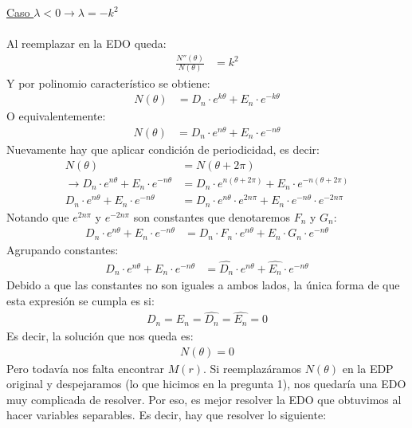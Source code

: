 \documentclass[
  11pt,
  letterpaper,
   answers
  ]{exam}
\begin{document}
\begin{questions}
\begin{solution}
\begin{parts}
    \underline{Caso $\lambda < 0 \rightarrow \lambda = - k^2$}
    \\
    \\
    Al reemplazar en la EDO queda:
    \begin{align}
        \frac{N''(\theta)}{N(\theta)} &= k^2
    \end{align}
    Y por polinomio característico se obtiene:
    \begin{align}
        N(\theta) &= D_n \cdot e^{k \theta} + E_n \cdot e^{-k \theta}
    \end{align}
    O equivalentemente:
    \begin{align}
      N(\theta) &= D_n \cdot e^{n \theta} + E_n \cdot e^{-n \theta}  
    \end{align}
    Nuevamente hay que aplicar condición de periodicidad, es decir:
    \begin{align}
        N(\theta) &= N(\theta + 2 \pi) \\
        \rightarrow D_n \cdot e^{n \theta} + E_n \cdot e^{-n \theta} &= D_n \cdot e^{n( \theta + 2 \pi)} + E_n \cdot e^{-n (\theta + 2 \pi)} \\
        D_n \cdot e^{n \theta} + E_n \cdot e^{-n \theta} &= D_n \cdot e^{n \theta} \cdot e^{2 n \pi} + E_n \cdot e^{-n \theta} \cdot e^{-2 n \pi}
    \end{align}
    Notando que $e^{2 n \pi}$ y $e^{-2 n \pi}$ son constantes que denotaremos $F_n$ y $G_n$:
    \begin{align}
        D_n \cdot e^{n \theta} + E_n \cdot e^{-n \theta} &= D_n \cdot F_n \cdot e^{n \theta} + E_n \cdot G_n \cdot e^{-n \theta}
    \end{align}
    Agrupando constantes:
    \begin{align}
        D_n \cdot e^{n \theta} + E_n \cdot e^{-n \theta} &= \hat{D_n} \cdot e^{n \theta} + \hat{E_n} \cdot e^{-n \theta}
    \end{align}
    Debido a que las constantes no son iguales a ambos lados, la única forma de que esta expresión se cumpla es si:
    \begin{align}
        D_n = E_n = \hat{D_n} = \hat{E_n} = 0
    \end{align}
    Es decir, la solución que nos queda es:
    \begin{align}
        N(\theta) = 0
    \end{align}
Pero todavía nos falta encontrar $M(r)$. Si reemplazáramos $N(\theta)$ en la EDP original y despejaramos (lo que hicimos en la pregunta 1), nos quedaría una EDO muy complicada de resolver. Por eso, es mejor resolver la EDO que obtuvimos al hacer variables separables. Es decir, hay que resolver lo siguiente:

\end{parts}
\end{solution}
\end{questions}
\end{document}
